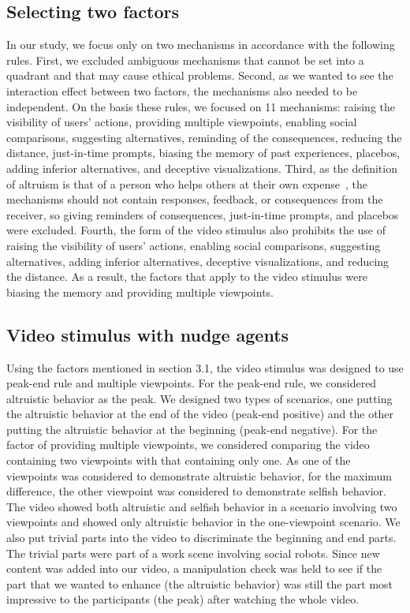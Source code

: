 \documentclass[runningheads]{llncs}
\begin{document}
\subsection{Selecting two factors}
In our study, we focus only on two mechanisms in accordance with the following rules. First, we excluded ambiguous mechanisms that cannot be set into a quadrant and that may cause ethical problems. Second, as we wanted to see the interaction effect between two factors, the mechanisms also needed to be independent. On the basis these rules, we focused on 11 mechanisms: raising the visibility of users' actions, providing multiple viewpoints, enabling social comparisons, suggesting alternatives, reminding of the consequences, reducing the distance, just-in-time prompts, biasing the memory of past experiences, placebos, adding inferior alternatives, and deceptive visualizations. Third, as the definition of altruism is that of a person who helps others at their own expense~\cite{ref_article22}, the mechanisms should not contain responses, feedback, or consequences from the receiver, so giving reminders of consequences, just-in-time prompts, and placebos were excluded. Fourth, the form of the video stimulus also prohibits the use of raising the visibility of users' actions, enabling social comparisons, suggesting alternatives, adding inferior alternatives, deceptive visualizations, and reducing the distance. As a result, the factors that apply to the video stimulus were biasing the memory and providing multiple viewpoints. 

\subsection{Video stimulus with nudge agents}
Using the factors mentioned in section 3.1, the video stimulus was designed to use peak-end rule and multiple viewpoints. For the peak-end rule, we considered altruistic behavior as the peak. We designed two types of scenarios, one putting the altruistic behavior at the end of the video (peak-end positive) and the other putting the altruistic behavior at the beginning (peak-end negative). For the factor of providing multiple viewpoints, we considered comparing the video containing two viewpoints with that containing only one. As one of the viewpoints was considered to demonstrate altruistic behavior, for the maximum difference, the other viewpoint was considered to demonstrate selfish behavior. The video showed both altruistic and selfish behavior in a scenario involving two viewpoints and showed only altruistic behavior in the one-viewpoint scenario. We also put trivial parts into the video to discriminate the beginning and end parts. The trivial parts were part of a work scene involving social robots. Since new content was added into our video, a manipulation check was held to see if the part that we wanted to enhance (the altruistic behavior) was still the part most impressive to the participants (the peak) after watching the whole video.
\end{document}
